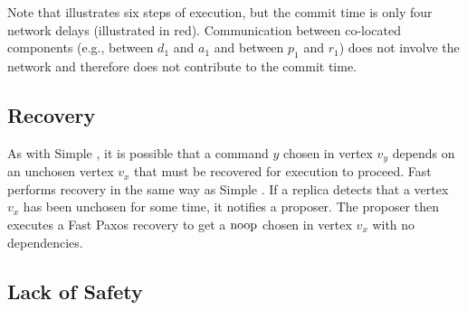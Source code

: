 Note that  illustrates six steps of execution, but the
commit time is only four network delays (illustrated in red). Communication
between co-located components (e.g., between $d_1$ and $a_1$ and between $p_1$
and $r_1$) does not involve the network and therefore does not contribute to
the commit time.

\subsection{Recovery}
As with Simple \BPaxos{}, it is possible that a command $y$ chosen in vertex
$v_y$ depends on an unchosen vertex $v_x$ that must be recovered for execution
to proceed. Fast \BPaxos{} performs recovery in the same way as Simple
\BPaxos{}. If a replica detects that a vertex $v_x$ has been unchosen for some
time, it notifies a proposer. The proposer then executes a Fast Paxos recovery
to get a $\text{noop}{}$ chosen in vertex $v_x$ with no dependencies.

\subsection{Lack of Safety}
{}

